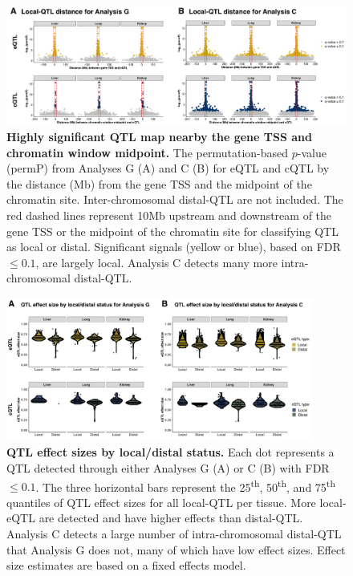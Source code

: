 \documentclass[10pt,letterpaper,twoside]{article}
\begin{document}
\begin{figure}[hp]
\renewcommand{\familydefault}{\sfdefault}\normalfont
\centering
\includegraphics[width=\textwidth]{figs/qtl_distance_all.png}
\caption{\textbf{Highly significant QTL map nearby the gene TSS and chromatin window midpoint.} 
The permutation-based $p$-value (permP) from Analyses G (A) and C (B) for eQTL and cQTL by the distance (Mb) from the gene TSS and the midpoint of the chromatin site. Inter-chromosomal distal-QTL are not included. The red dashed lines represent 10Mb upstream and downstream of the gene TSS or the midpoint of the chromatin site for classifying QTL as local or distal. Significant signals (yellow or blue), based on FDR $\le 0.1$, are largely local. Analysis C detects many more intra-chromosomal distal-QTL.
\label{fig:dist_all}}
\end{figure}

\clearpage

\begin{figure}[hp]
\renewcommand{\familydefault}{\sfdefault}\normalfont
\centering
\includegraphics[width=0.9\textwidth, trim={0in 0.25in 0in 0in}, clip]{figs/qtl_effect_sizes_local_v_distal.png}
\caption{\textbf{QTL effect sizes by local/distal status.} 
Each dot represents a QTL detected through either Analyses G (A) or C (B) with FDR $\le 0.1$. The three horizontal bars represent the 25\textsuperscript{th}, 50\textsuperscript{th}, and 75\textsuperscript{th} quantiles of QTL effect sizes for all local-QTL per tissue. More local-eQTL are detected and have higher effects than distal-QTL. Analysis C detects a large number of intra-chromosomal distal-QTL that Analysis G does not, many of which have low effect sizes. Effect size estimates are based on a fixed effects model.
\label{fig:qtl_effect_sizes_local_v_distal}}
\end{figure}
\end{document}
